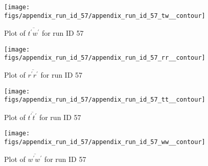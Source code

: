 \begin{figure}[H]
\centering
\texttt{[image: figs/appendix\_run\_id\_57/appendix\_run\_id\_57\_tw\_\_contour]}
\caption{Plot of $\overline{t^\prime w^\prime}$ for run ID 57}
\label{fig:appendix_run_id_57_tw__contour}
\end{figure}


\begin{figure}[H]
\centering
\texttt{[image: figs/appendix\_run\_id\_57/appendix\_run\_id\_57\_rr\_\_contour]}
\caption{Plot of $\overline{r^\prime r^\prime}$ for run ID 57}
\label{fig:appendix_run_id_57_rr__contour}
\end{figure}


\begin{figure}[H]
\centering
\texttt{[image: figs/appendix\_run\_id\_57/appendix\_run\_id\_57\_tt\_\_contour]}
\caption{Plot of $\overline{t^\prime t^\prime}$ for run ID 57}
\label{fig:appendix_run_id_57_tt__contour}
\end{figure}


\begin{figure}[H]
\centering
\texttt{[image: figs/appendix\_run\_id\_57/appendix\_run\_id\_57\_ww\_\_contour]}
\caption{Plot of $\overline{w^\prime w^\prime}$ for run ID 57}
\label{fig:appendix_run_id_57_ww__contour}
\end{figure}


